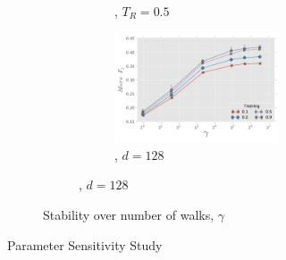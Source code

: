\begin{figure}[t!]
\begin{subfigure}[b]{\columnwidth}
\begin{subfigure}[b]{\columnwidth}
\begin{subfigure}{0.5\columnwidth}
			    \addtocounter{subfigure}{-1}%
		       \renewcommand\thesubfigure{\alph{subfigure}3}%
               \caption{\blogcatalog,  $T_R=0.5$}                
			   \label{fig:stability_blogcatalog-passes_vs_dims}	                   
        \end{subfigure}%
        \begin{subfigure}{0.5\columnwidth}
                \includegraphics[width=\columnwidth]{figures/stability/blogcatalog_training_vs_walks_per_node.pdf}%
			    \addtocounter{subfigure}{-1}%
		        \renewcommand\thesubfigure{\alph{subfigure}4} %
                \caption{\blogcatalog, $d=128$} %
		        \label{fig:stability_blogcatalog-passes_vs_training}                  
        \end{subfigure}  
        \addtocounter{subfigure}{-1}
        \end{subfigure}%
        \addtocounter{subfigure}{-1}                                 
		\caption{Stability over number of walks, $\gamma$}
		\label{fig:stability_passes}
		\end{subfigure}%
\caption{Parameter Sensitivity Study}
\label{fig:stability}
\end{figure}
